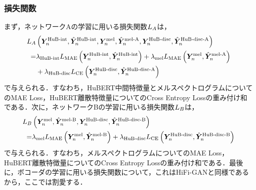 \subsubsection{損失関数}
まず，ネットワークAの学習に用いる損失関数$L_{A}$は，
\begin{equation}
    \begin{aligned}
        L_{A} & \left(\bm{Y}^{\text{HuB-int}}_{n}, \hat{\bm{Y}}^{\text{HuB-int}}_{n}, \bm{Y}^{\text{mel}}_{n}, \hat{\bm{Y}}^{\text{mel-A}}_{n}, \bm{Y}^{\text{HuB-disc}}_{n}, \hat{\bm{Y}}^{\text{HuB-disc-A}}_{n}\right)                 \\
        =                  & \lambda_{\text{HuB-int}} L_{\text{MAE}}\left(\bm{Y}^{\text{HuB-int}}_{n}, \hat{\bm{Y}}^{\text{HuB-int}}_{n}\right) + \lambda_{\text{mel}} L_{\text{MAE}}\left(\bm{Y}^{\text{mel}}_{n}, \hat{\bm{Y}}^{\text{mel-A}}_{n}\right) \\
                           & + \lambda_{\text{HuB-disc}} L_{\text{CE}}\left(\bm{Y}^{\text{HuB-disc}}_{n}, \hat{\bm{Y}}^{\text{HuB-disc-A}}_{n}\right)
    \end{aligned}
\end{equation}
で与えられる．すなわち，HuBERT中間特徴量とメルスペクトログラムについてのMAE Loss，HuBERT離散特徴量についてのCross Entropy Lossの重み付け和である．次に，ネットワークBの学習に用いる損失関数$L_{B}$は，
\begin{equation}
    \begin{aligned}
        L_{B} & \left(\bm{Y}^{\text{mel}}_{n}, \hat{\bm{Y}}^{\text{mel-B}}_{n}, \bm{Y}^{\text{HuB-disc}}_{n}, \hat{\bm{Y}}^{\text{HuB-disc-B}}_{n}\right)                                                  \\
        =                  & \lambda_{\text{mel}} L_{\text{MAE}}\left(\bm{Y}^{\text{mel}}_{n}, \hat{\bm{Y}}^{\text{mel-B}}_{n}\right) + \lambda_{\text{HuB-disc}} L_{\text{CE}}\left(\bm{Y}^{\text{HuB-disc}}_{n}, \hat{\bm{Y}}^{\text{HuB-disc-B}}_{n}\right)
    \end{aligned}
\end{equation}
で与えられる．すなわち，メルスペクトログラムについてのMAE Loss，HuBERT離散特徴量についてのCross Entropy Lossの重み付け和である．最後に，ボコーダの学習に用いる損失関数について，これはHiFi-GANと同様であるから，ここでは割愛する．